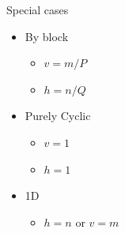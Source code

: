 \documentclass[xcolor={rgb,x11names,svgnames},rgb,x11names,svgnames]{beamer}
\begin{document}
\begin{frame}[label=block-cyclic]
\begin{columns}
\begin{column}{6cm}
  \begin{exampleblock}{Special cases}
    \begin{itemize}
    \item By block
      \begin{itemize}
      \item $v = m / P$
      \item $h = n / Q$
      \end{itemize}
    
    
    \item Purely Cyclic
      \begin{itemize}
      \item $v = 1$
      \item $h = 1$
      \end{itemize}

    \item 1D
      \begin{itemize}
      \item $h = n$ or $v = m$
      \end{itemize}
    \end{itemize}

  \end{exampleblock}
  
\end{column}
\end{columns}
\end{frame}

\end{document}
